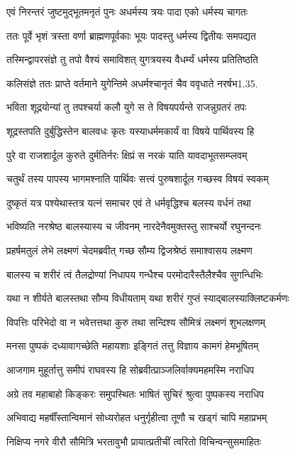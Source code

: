 \twolineshloka
{एवं निरन्तरं जुष्टमुद्भूतमनृतं पुनः}
{अधर्मस्य त्रयः पादा एको धर्मस्य चागतः}%

\twolineshloka
{ततः पूर्वे भृशं त्रस्ता वर्णा ब्राह्मणपूर्वकाः}
{भूयः पादस्तु धर्मस्य द्वितीयः समपद्यत}%

\twolineshloka
{तस्मिन्द्वापरसंज्ञे तु तपो वैश्यं समाविशत्}
{युगत्रयस्य वैधर्म्यं धर्मस्य प्रतितिष्ठति}%

\twolineshloka
{कलिसंज्ञे ततः प्राप्ते वर्तमाने युगेन्तिमे}
{अधर्मश्चानृतं चैव ववृधाते नरर्षभ1.35.}%

\twolineshloka
{भविता शूद्रयोन्यां तु तपश्चर्या कलौ युगे}
{स ते विषयपर्यन्ते राजन्नुग्रतरं तपः}%

\twolineshloka
{शूद्रस्तपति दुर्बुद्धिस्तेन बालवधः कृतः}
{यस्याधर्ममकार्यं वा विषये पार्थिवस्य हि}%

\twolineshloka
{पुरे वा राजशार्दूल कुरुते दुर्मतिर्नरः}
{क्षिप्रं स नरकं याति यावदाभूतसम्प्लवम्}%

\twolineshloka
{चतुर्थं तस्य पापस्य भागमश्नाति पार्थिवः}
{सत्त्वं पुरुषशार्दूल गच्छस्व विषयं स्वकम्}%

\twolineshloka
{दुष्कृतं यत्र पश्येथास्तत्र यत्नं समाचर}
{एवं ते धर्मवृद्धिश्च बलस्य वर्धनं तथा}%

\twolineshloka
{भविष्यति नरश्रेष्ठ बालस्यास्य च जीवनम्}
{नारदेनैवमुक्तस्तु साश्चर्यो रघुनन्दनः}%

\twolineshloka
{प्रहर्षमतुलं लेभे लक्ष्मणं चेदमब्रवीत्}
{गच्छ सौम्य द्विजश्रेष्ठं समाश्वासय लक्ष्मण}%

\twolineshloka
{बालस्य च शरीरं त्वं तैलद्रोण्यां निधापय}
{गन्धैश्च परमोदारैस्तैलैश्चैव सुगन्धिभिः}%

\twolineshloka
{यथा न शीर्यते बालस्तथा सौम्य विधीयताम्}
{यथा शरीरं गुप्तं स्याद्बालस्याक्लिष्टकर्मणः}%

\twolineshloka
{विपत्तिः परिभेदो वा न भवेत्तत्तथा कुरु}
{तथा सन्दिश्य सौमित्रं लक्ष्मणं शुभलक्षणम्}%

\twolineshloka
{मनसा पुष्पकं दध्यावागच्छेति महायशाः}
{इङ्गितं तत्तु विज्ञाय कामगं हेमभूषितम्}%

\twolineshloka
{आजगाम मुहूर्तात्तु समीपं राघवस्य हि}
{सोब्रवीत्प्राञ्जलिर्वाक्यमहमस्मि नराधिप}%

\twolineshloka
{अग्रे तव महाबाहो किङ्करः समुपस्थितः}
{भाषितं सुचिरं श्रुत्वा पुष्पकस्य नराधिप}%

\twolineshloka
{अभिवाद्य महर्षींस्तान्विमानं सोध्यरोहत}
{धनुर्गृहीत्वा तूणौ च खड्गं चापि महाप्रभम्}%

\twolineshloka
{निक्षिप्य नगरे वीरौ सौमित्रि भरतावुभौ}
{प्रायात्प्रतीचीं त्वरितो विचिन्वन्सुसमाहितः}%

